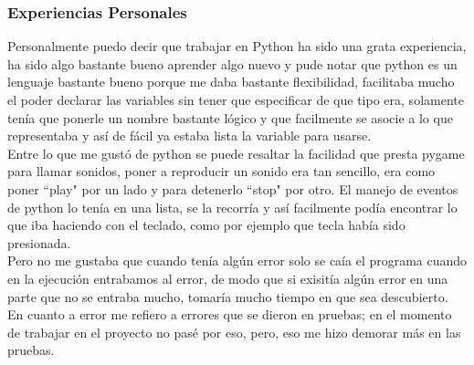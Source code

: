 \documentclass[10pt]{article}
\begin{document}
{\begin{flushleft}
\subsubsection{Experiencias Personales}
Personalmente puedo decir que trabajar en Python ha sido una grata experiencia, ha sido algo bastante bueno aprender algo nuevo y pude notar que python es un lenguaje bastante bueno porque me daba bastante flexibilidad, facilitaba mucho el poder declarar las variables sin tener que especificar de que tipo era, solamente ten\'ia que ponerle un nombre bastante l\'ogico y que facilmente se asocie a lo que representaba y as\'i de f\'acil ya estaba lista la variable para usarse.\\\vspace{0.1in}
Entre lo que me gust\'o de python se puede resaltar la facilidad que presta pygame para llamar sonidos, poner a reproducir un sonido era tan sencillo, era como poner ``play" por un lado y para detenerlo ``stop" por otro. El manejo de eventos de python lo ten\'ia en una lista, se la recorr\'ia y as\'i facilmente pod\'ia encontrar lo que  iba haciendo con el teclado, como por ejemplo que tecla hab\'ia sido presionada.\\\vspace{0.1in}
Pero no me gustaba que cuando ten\'ia alg\'un error solo se ca\'ia el programa cuando en la ejecuci\'on entrabamos al error, de modo que si exisit\'ia alg\'un error en una parte que no se entraba mucho, tomar\'ia mucho tiempo en que sea descubierto. En cuanto a error me refiero a errores que se dieron en pruebas; en el momento de trabajar en el proyecto no pas\'e por eso, pero, eso me hizo demorar m\'as en las pruebas.

\newpage

\end{flushleft}}
\end{document}
